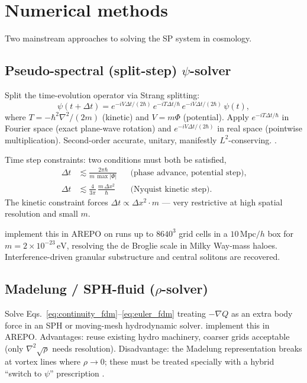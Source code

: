 \documentclass[12pt]{article}
\newcommand{\eV}{\,\mathrm{eV}}
\newcommand{\Mpc}{\,\mathrm{Mpc}}
\begin{document}
\section{Numerical methods}
\label{sec:numerical}

Two mainstream approaches to solving the SP system in cosmology.

\subsection{Pseudo-spectral (split-step) $\psi$-solver}

Split the time-evolution operator via Strang splitting:
%
\begin{equation}
  \psi(t+\Delta t)
    = e^{-iV\Delta t/(2\hbar)}\,
      e^{-iT\Delta t/\hbar}\,
      e^{-iV\Delta t/(2\hbar)}\,\psi(t),
\end{equation}
%
where $T = -\hbar^2\nabla^2/(2m)$ (kinetic) and $V = m\Phi$
(potential).  Apply $e^{-iT\Delta t/\hbar}$ in Fourier space (exact
plane-wave rotation) and $e^{-iV\Delta t/(2\hbar)}$ in real space
(pointwise multiplication).  Second-order accurate, unitary,
manifestly $L^2$-conserving.  \citep{Schive2014,MaySpringel2021,Mocz2017,Mocz2020}.

Time step constraints: two conditions must both be satisfied,
%
\begin{align}
  \Delta t &\lesssim \frac{2\pi\hbar}{m\,\max|\Phi|}
    &&\text{(phase advance, potential step)}, \\
  \Delta t &\lesssim \frac{4}{3\pi}\,\frac{m\,\Delta x^2}{\hbar}
    &&\text{(Nyquist kinetic step)}.
\end{align}
%
The kinetic constraint forces $\Delta t\propto \Delta x^2 \cdot m$
--- very restrictive at high spatial resolution and small $m$.

\citet{MaySpringel2021} implement this in AREPO on runs up to
$8640^3$ grid cells in a $10\Mpc/h$ box for $m=2\times 10^{-23}\eV$,
resolving the de Broglie scale in Milky Way-mass haloes.
Interference-driven granular substructure and central solitons are
recovered.

\subsection{Madelung / SPH-fluid ($\rho$-solver)}

Solve Eqs.~\eqref{eq:continuity_fdm}--\eqref{eq:euler_fdm} treating
$-\nabla Q$ as an extra body force in an SPH or moving-mesh
hydrodynamic solver.  \citet{Mocz2017} implement this in AREPO.
Advantages: reuse existing hydro machinery, coarser grids acceptable
(only $\nabla^2\sqrt\rho$ needs resolution).  Disadvantage: the
Madelung representation breaks at vortex lines where $\rho\to 0$;
these must be treated specially with a hybrid ``switch to $\psi$''
prescription \citep{Mocz2020}.
\end{document}
